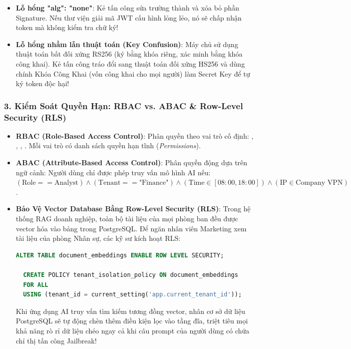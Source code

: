 \begin{securitybox}
\begin{itemize}
  \item \textbf{Lỗ hổng "alg": "none"}: Kẻ tấn công sửa trường  thành  và xóa bỏ phần Signature. Nếu thư viện giải mã JWT cấu hình lỏng lẻo, nó sẽ chấp nhận token mà không kiểm tra chữ ký!
  \item \textbf{Lỗ hổng nhầm lẫn thuật toán (Key Confusion)}: Máy chủ sử dụng thuật toán bất đối xứng RS256 (ký bằng khóa riêng, xác minh bằng khóa công khai). Kẻ tấn công tráo đổi sang thuật toán đối xứng HS256 và dùng chính Khóa Công Khai (vốn công khai cho mọi người) làm Secret Key để tự ký token độc hại!
\end{itemize}
\end{securitybox}

\subsubsection{3. Kiểm Soát Quyền Hạn: RBAC vs. ABAC \& Row-Level Security (RLS)}
\begin{itemize}
  \item \textbf{RBAC (Role-Based Access Control)}: Phân quyền theo vai trò cố định: , , , . Mỗi vai trò có danh sách quyền hạn tĩnh (\textit{Permissions}).
  \item \textbf{ABAC (Attribute-Based Access Control)}: Phân quyền động dựa trên ngữ cảnh: Người dùng chỉ được phép truy vấn mô hình AI nếu: $(\text{Role} == \text{Analyst}) \land (\text{Tenant} == \text{"Finance"}) \land (\text{Time} \in [08:00, 18:00]) \land (\text{IP} \in \text{Company VPN})$.
  \item \textbf{Bảo Vệ Vector Database Bằng Row-Level Security (RLS)}: Trong hệ thống RAG doanh nghiệp, toàn bộ tài liệu của mọi phòng ban đều được vector hóa vào bảng  trong PostgreSQL. Để ngăn nhân viên Marketing xem tài liệu của phòng Nhân sự, các kỹ sư kích hoạt RLS:
  \begin{lstlisting}[language=SQL]
  ALTER TABLE document_embeddings ENABLE ROW LEVEL SECURITY;
  
  CREATE POLICY tenant_isolation_policy ON document_embeddings
  FOR ALL
  USING (tenant_id = current_setting('app.current_tenant_id'));
  \end{lstlisting}
  Khi ứng dụng AI truy vấn tìm kiếm tương đồng vector, nhân cơ sở dữ liệu PostgreSQL sẽ tự động chèn thêm điều kiện lọc  vào tầng đĩa, triệt tiêu mọi khả năng rò rỉ dữ liệu chéo ngay cả khi câu prompt của người dùng có chứa chỉ thị tấn công Jailbreak!
\end{itemize}

